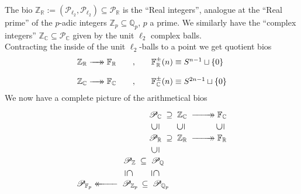 \documentclass[leqno]{article}
\newcommand{\xtworightarrow}[2][]{%
				  \xrightarrow[#1]{#2}\mathrel{\mkern-14mu}\rightarrow
	}
\newcommand{\xtwoleftarrow}[2][]{%
				  \leftarrow\mathrel{\mkern -14mu}\xleftarrow[#1]{#2}
	}
\newcommand{\F}{\mathbb{F}}
\newcommand{\Q}{\mathbb{Q}}
\newcommand{\R}{\mathbb{R}}
\newcommand{\C}{\mathbb{C}}
\newcommand{\Z}{\mathbb{Z}}
\newcommand{\biop}{\mathscr{P}}
\numberwithin{equation}{section}
\begin{document}
\noindent The bio $\mathbb{Z}_{\mathbb{R}}:=(\biop_{\ell_2},\biop_{\ell_2})\subseteq \biop_{\R}$ is the ``Real integers'',
analogue at the ``Real prime'' of the $p$-adic integers $\Z_{p}\subseteq
\Q_{p}$, $p$ a prime. We similarly have the ``complex integers'' $\Z_{\C}\subseteq
\biop_{\C}$ given by the unit $\ell_{2}$ complex balls. \\
Contracting the inside of the unit $\ell_{2}$-balls to a point we get quotient bios 
\begin{equation}
				\begin{array}[H]{lll}
								\Z_{\R}\xtworightarrow{\quad} \F_{\R}\quad &, \quad & \F_{\R}^{\pm}(n)\equiv
				S^{n-1}\sqcup \left\{ 0 \right\} \\\\ %
				\Z_{\C}\xtworightarrow{\quad} \F_{\C} &,  & \F_{\C}^{\pm}(n)\equiv
				S^{2n-1}\sqcup \left\{ 0 \right\} 
				\end{array}
				\label{eq:3.5}
\end{equation}
We now have a complete picture of the arithmetical bios 
\begin{align}
				\begin{array}[H]{l}
				 \begin{tikzpicture}
								\node at (50mm,35mm) {$\biop_{\C}\;\supseteq\;\Z_{\C}\;\xtworightarrow{\qquad}\F_{\C}$};
								\node at (36mm,30mm) {\rotatebox{90}{\large$\subseteq$}};
								\node at (47mm,30mm) {\rotatebox{90}{\large$\subseteq$}};
								\node at (64mm,30mm) {\rotatebox{90}{\large$\subseteq$}};
								\node at (36mm,20mm) {\rotatebox{90}{\large$\subseteq$}};
								\node at (50mm,25mm) {$\biop_{\R}\;\supseteq\;\Z_{\R}\;\xtworightarrow{\qquad}\F_{\R}$};
								\node at (31mm,15mm) {$\biop_{\Z}\;\subseteq\; \biop_{\Q}$};
								\node at (22mm,05mm) {$\biop_{\F_{p}} \xtwoleftarrow{\qquad}\; \biop_{\Z_p}\,\subseteq\; \biop_{\Q_p}$};
								\node at (24.5mm,10mm) {\rotatebox{270}{\large$\subseteq$}};
								\node at (36mm,10mm) {\rotatebox{270}{\large$\subseteq$}};
				\end{tikzpicture}
				\end{array}
				\label{eq:3.6}
\end{align}
\end{document}
